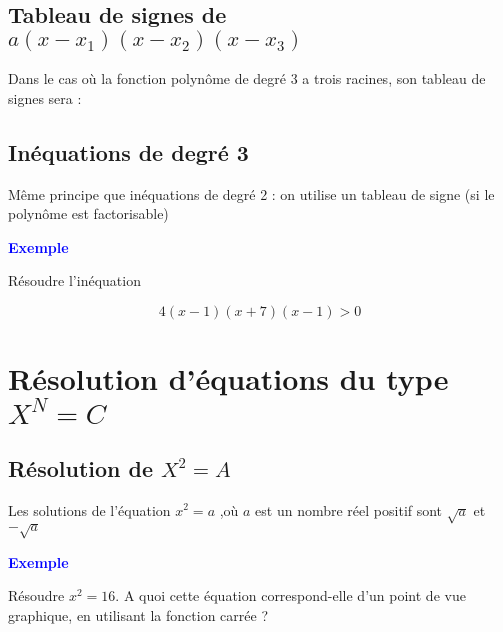 \documentclass[a4paper,12pt]{article}
\begin{document}
\subsection*{Tableau de signes de $a(x - x_1)(x - x_2)(x - x_3)$}

Dans le cas où la fonction polynôme de degré 3 a trois racines, son tableau de signes sera : \par
\vspace{1em}


\subsection*{Inéquations de degré 3}

Même principe que inéquations de degré 2 : on utilise un tableau de signe (si le polynôme est factorisable)

\vspace{1em}
\textbf{\textcolor{blue}{Exemple}} \par
\vspace{1em}
Résoudre l'inéquation

\[
 4(x - 1)(x + 7)(x - 1) > 0
\]

\section*{Résolution d'équations du type \(X^N = C\)}

\subsection*{Résolution de \(X^2 = A\)}

Les solutions de l’équation \(x^2 = a\) ,où \(a\) est un nombre réel positif sont \(\sqrt{a}\) et \(- \sqrt{a}\) \par 
\vspace{1em}
\textbf{\textcolor{blue}{Exemple}} \par
\vspace{1em}
Résoudre $x^2 = 16$. A quoi cette équation correspond-elle d'un point de vue graphique, en utilisant la fonction carrée ?
\vspace{1em}
\vspace{1em}
\end{document}
